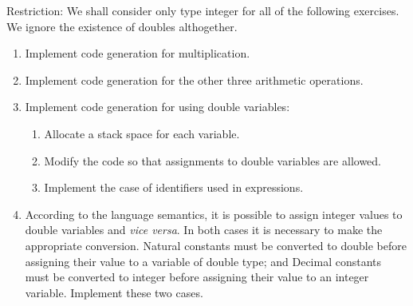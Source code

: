 
Restriction: We shall consider only type integer for all of the following exercises. We ignore the existence of doubles althogether.
\begin{enumerate}
\item Implement code generation for multiplication.
\item Implement code generation for the other three arithmetic operations.
\item Implement code generation for using double variables:
\begin{enumerate}
\item Allocate a stack space for each variable.
\item Modify the code so that assignments to double variables are allowed.
\item Implement the case of identifiers used in expressions.
\end{enumerate}
\item According to the language semantics, it is possible to assign integer values to double variables and \textit{vice versa}. In both cases it is necessary to make the appropriate conversion. Natural constants must be converted to double before assigning their value to a variable of double type; and Decimal constants must be converted to integer before assigning their value to an integer variable. Implement these two cases.
\end{enumerate}


